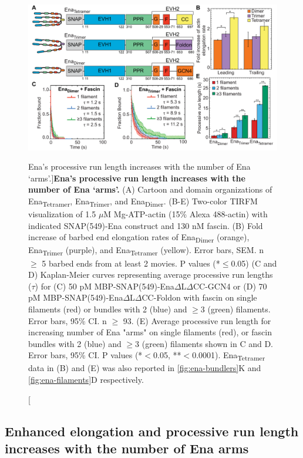 \begin{figure}
\centering
\includegraphics[width=\textwidth]{img/ch02/Figure_3_elife.pdf}
\caption[Ena's processive run length increases with the number of Ena ‘arms'.]{\textbf{Ena's processive run length increases with the number of Ena ‘arms'.} (A) Cartoon and domain organizations of Ena\textsubscript{Tetramer}, Ena\textsubscript{Trimer}, and Ena\textsubscript{Dimer}. (B-E) Two-color TIRFM visualization of 1.5 $\mu$M Mg-ATP-actin (15\% Alexa 488-actin) with indicated SNAP(549)-Ena construct and 130 nM fascin. (B) Fold increase of barbed end elongation rates of Ena\textsubscript{Dimer} (orange), Ena\textsubscript{Trimer} (purple), and Ena\textsubscript{Tetramer} (yellow). Error bars, SEM. n $\geq$ 5 barbed ends from at least 2 movies. P values (*$\leq$0.05) (C and D) Kaplan-Meier curves representing average processive run lengths ($\tau$) for (C) 50 pM MBP-SNAP(549)-Ena$\Delta$L$\Delta$CC-GCN4 or (D) 70 pM MBP-SNAP(549)-Ena$\Delta$L$\Delta$CC-Foldon with fascin on single filaments (red) or bundles with 2 (blue) and $\geq$3 (green) filaments. Error bars, 95\% CI. n $\geq$ 93. (E) Average processive run length for increasing number of Ena "arms" on single filaments (red), or fascin bundles with 2 (blue) and $\geq$3 (green) filaments shown in C and D. Error bars, 95\% CI. P values (*$<$0.05, **$<$0.0001). Ena\textsubscript{Tetramer} data in (B) and (E) was also reported in \ref{fig:ena-bundlers}K and \ref{fig:ena-filaments}D respectively. }
\label{fig:ena-arms}
\end{figure}

\subsection{Enhanced elongation and processive run length increases with the number of Ena arms}\label{ena-processive-arms}

